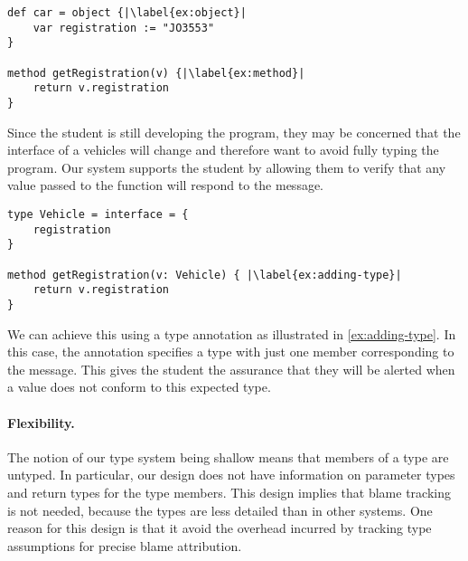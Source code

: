 \begin{lstlisting}[caption={The start of a simple program for tracking vehicle information.},label=lst:car-reg,escapechar=|,float,floatplacement=htbp]
def car = object {|\label{ex:object}|
    var registration := "JO3553"
}

method getRegistration(v) {|\label{ex:method}|
    return v.registration
}
\end{lstlisting}

Since the student is still developing the program, 
they may be concerned that the interface of a vehicles will change 
and therefore want to avoid fully typing the program.
Our system supports the student by allowing them to verify
that any value passed to the  function will respond
to the  message. 


\begin{lstlisting}[caption={Adding a type annotation to a method parameter.},escapechar=|,float,floatplacement=htbp]
type Vehicle = interface = {
    registration    
}

method getRegistration(v: Vehicle) { |\label{ex:adding-type}|
    return v.registration
}
\end{lstlisting}

We can achieve this using a type annotation 
as illustrated in \cref{ex:adding-type}. 
In this case, 
the annotation specifies a type with just one member
corresponding to the  message.
This gives the student the assurance that they will be alerted when a value 
does not conform to this expected type.

\paragraph{Flexibility.}

The notion of our type system being shallow means 
that members of a type are untyped.
In particular, our design does not have information on parameter types
and return types for the type members.
This design implies that blame tracking is not needed,
because the types are less detailed than in other systems.
One reason for this design is that it avoid the overhead incurred
by tracking type assumptions for precise blame attribution.


